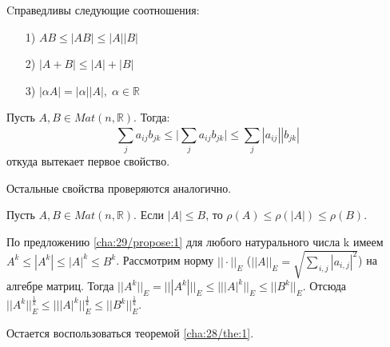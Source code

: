 \begin{propose}\label{cha:29/propose:1}
	Cправедливы следующие соотношения:
	\begin{itemize}
		\item[1)] $AB \le |AB| \le |A||B|$
		\item[2)] $|A+B|\le|A|+|B|$
		\item[3)] $|\alpha A| = |\alpha||A|, \; \alpha \in \mathbb{R}$
	\end{itemize}
\end{propose}
\begin{Proof}
	Пусть $A, B \in Mat(n, \mathbb{R})$. Тогда:
	$$\underset{j}{\overset{}{\sum}}a_{ij}b_{jk} \le \Big| \underset{j}{\overset{}{\sum}}a_{ij}b_{jk} \Big| \le \underset{j}{\overset{}{\sum}}|a_{ij}||b_{jk}|$$
	откуда вытекает первое свойство.
	
	Остальные свойства проверяются аналогично.
\end{Proof}

\begin{propose}\label{cha:29/propose:2}
	Пусть $A, B \in Mat(n, \mathbb{R})$. Если $|A| \le B$, то $\rho(A) \le \rho(|A|) \le \rho(B)$.
\end{propose}
\begin{Proof}
	По предложению \ref{cha:29/propose:1} для любого натурального числа k имеем $A^k \le |A^k| \le |A|^k \le B^k$. Рассмотрим норму $||\cdot||_E$ ($||A||_E = \sqrt{\underset{i,j}{\overset{}{\sum}}|a_{i,j}|^2}$) на алгебре матриц. Тогда $\displaystyle ||A^k||_E = \Big|\Big| |A^k| \Big|\Big|_E \le \Big|\Big| |A|^k \Big|\Big|_E \le ||B^k||_E$. Отсюда $\displaystyle ||A^k||_E^{\frac{1}{k}} \le \Big|\Big| |A|^k \Big|\Big|_E^{\frac{1}{k}} \le ||B^k||_E^{\frac{1}{k}}$.

	Остается воспользоваться теоремой \ref{cha:28/the:1}.
\end{Proof}


